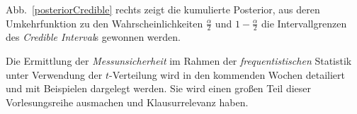 Abb.~\ref{posteriorCredible} rechts zeigt die kumulierte Posterior, aus deren Umkehrfunktion
zu den Wahrscheinlichkeiten $\frac{\alpha}{2}$ und $1 - \frac{\alpha}{2}$ die
Intervallgrenzen des \textsl{Credible Interval}s gewonnen werden.

Die Ermittlung der \textsl{Messunsicherheit} im Rahmen der
\textsl{frequentistischen} Statistik unter Verwendung der $t$-Verteilung
wird in den kommenden Wochen detailiert und mit Beispielen dargelegt werden.
Sie wird einen großen Teil dieser Vorlesungsreihe ausmachen und Klausurrelevanz haben.
